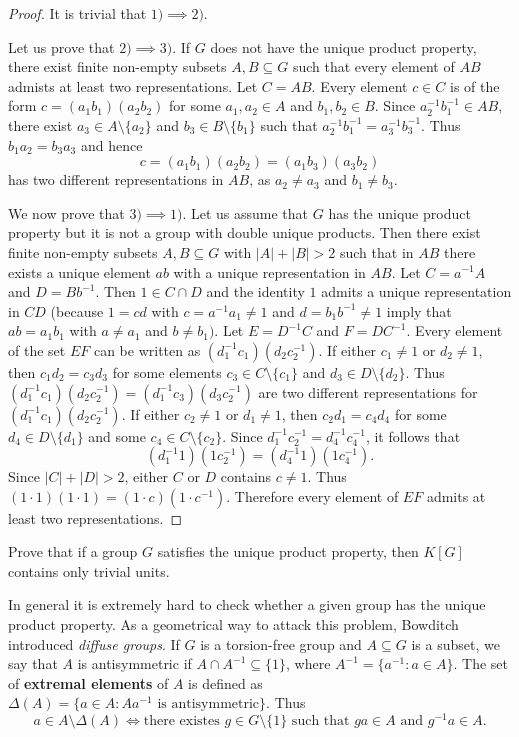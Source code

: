 \begin{proof}
	It is trivial that $1)\implies2)$.  
	
	Let us prove that 
	$2)\implies3)$. If $G$ does not have the unique product property, 
	there exist finite non-empty subsets 
	$A,B\subseteq G$ such that every element of 
	$AB$ admists at least two representations. Let $C=AB$. Every element $c\in C$ is 
	of the form $c=(a_1b_1)(a_2b_2)$ for some $a_1,a_2\in A$ and $b_1,b_2\in B$. Since 
	$a_2^{-1}b_1^{-1}\in AB$, there exist $a_3\in A\setminus\{a_2\}$ and
	$b_3\in B\setminus\{b_1\}$ such that 
	$a_2^{-1}b_1^{-1}=a_3^{-1}b_3^{-1}$. Thus $b_1a_2=b_3a_3$ and hence 
	\[
	c=(a_1b_1)(a_2b_2)=(a_1b_3)(a_3b_2)
	\]
	has two different representations in $AB$, 
	as $a_2\ne a_3$ and $b_1\ne b_3$.

	We now prove that $3)\implies1)$. Let us assume that $G$ has the unique product property 
	but it is not a group with double unique products. Then there exist 
	finite non-empty subsets 
	$A,B\subseteq G$ with $|A|+|B|>2$ such that 
	in $AB$ there exists a unique element $ab$ with a unique representation in $AB$.
	Let $C=a^{-1}A$ and $D=Bb^{-1}$. Then $1\in C\cap D$ and the identity 
	$1$ admits a unique representation in $CD$ (because $1=cd$ with 
	$c=a^{-1}a_1\ne 1$ and $d=b_1b^{-1}\ne 1$ imply that $ab=a_1b_1$ with $a\ne
	a_1$ and $b\ne b_1)$. Let $E=D^{-1}C$ and $F=DC^{-1}$. Every element of the set $EF$
	can be written as $(d_1^{-1}c_1)(d_2c_2^{-1})$. If either $c_1\ne 1$ or $d_2\ne 1$, 
	then $c_1d_2=c_3d_3$ for some elements $c_3\in C\setminus\{c_1\}$ and  
	$d_3\in D\setminus\{d_2\}$. Thus 
	$(d_1^{-1}c_1)(d_2c_2^{-1})=(d_1^{-1}c_3)(d_3c_2^{-1})$ are two different representations 
    for $(d_1^{-1}c_1)(d_2c_2^{-1})$. If either $c_2\ne 1$
	or $d_1\ne 1$, then $c_2d_1=c_4d_4$ for some $d_4\in D\setminus\{d_1\}$
	and some $c_4\in C\setminus\{c_2\}$. Since 
	$d_1^{-1}c_2^{-1}=d_4^{-1}c_4^{-1}$, it follows that 
	\[
	(d_1^{-1}1)(1c_2^{-1})=(d_4^{-1}1)(1c_4^{-1}).
	\]
	Since $|C|+|D|>2$, either $C$ or 
	$D$ contains $c\ne1$. Thus $(1\cdot 1)(1\cdot 1)=(1\cdot
	c)(1\cdot c^{-1})$. Therefore every element of $EF$ 
	admits at least two representations. 
\end{proof}

\begin{exercise}
	Prove that if a group $G$ satisfies the unique product property, then 
    $K[G]$ contains only trivial units.
\end{exercise}

In general it is extremely hard to check whether a given group
has the unique product property. As a geometrical way to 
attack this problem, Bowditch introduced \emph{diffuse groups}. If
$G$ is a torsion-free group and 
$A\subseteq G$ is a subset, we say that $A$ is antisymmetric 
if $A\cap A^{-1}\subseteq\{1\}$, where $A^{-1}=\{a^{-1}:a\in
A\}$. The set of \textbf{extremal elements} of $A$ is defined as 
$\Delta(A)=\{a\in A:Aa^{-1}\text{ is antisymmetric}\}$. 
Thus 
\[
	a\in A\setminus\Delta(A)
	\Longleftrightarrow
	\text{there existes $g\in G\setminus\{1\}$ such that $ga\in A$ and $g^{-1}a\in A$}.
\]

